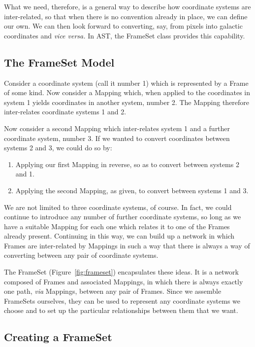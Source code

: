 \documentclass[twoside,11pt]{article}
\newcommand{\htmlref}[2]{#1}
\begin{document}
What we need, therefore, is a general way to describe how coordinate
systems are inter-related, so that when there is no convention already
in place, we can define our own. We can then look forward to
converting, say, from pixels into galactic coordinates and {\em{vice
versa.}}  In AST, the \htmlref{FrameSet}{FrameSet} class provides this capability.

\subsection{The FrameSet Model}

Consider a coordinate system (call it number 1) which is represented
by a \htmlref{Frame}{Frame} of some kind. Now consider a \htmlref{Mapping}{Mapping} which, when applied to
the coordinates in system 1 yields coordinates in another system,
number 2. The Mapping therefore inter-relates coordinate systems 1 and
2.

Now consider a second Mapping which inter-relates system 1 and a
further coordinate system, number 3. If we wanted to convert
coordinates between systems 2 and 3, we could do so by:

\begin{enumerate}
\item Applying our first Mapping in reverse, so as to convert between
systems 2 and 1.

\item Applying the second Mapping, as given, to convert between
systems 1 and 3.
\end{enumerate}

We are not limited to three coordinate systems, of course. In fact, we
could continue to introduce any number of further coordinate systems,
so long as we have a suitable Mapping for each one which relates it to
one of the Frames already present. Continuing in this way, we can
build up a network in which Frames are inter-related by Mappings in
such a way that there is always a way of converting between any pair
of coordinate systems.

The \htmlref{FrameSet}{FrameSet} (Figure~\ref{fig:frameset}) encapsulates these ideas.  It
is a network composed of Frames and associated Mappings, in which
there is always exactly one path, {\em{via}} Mappings, between any
pair of Frames.  Since we assemble FrameSets ourselves, they can be
used to represent any coordinate systems we choose and to set up the
particular relationships between them that we want.

\subsection{\label{ss:creatingaframeset}Creating a FrameSet}
\end{document}
